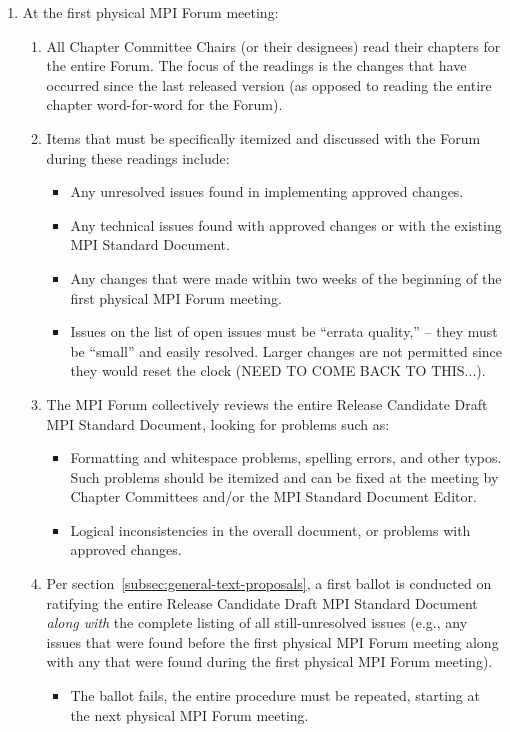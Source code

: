 {{\begin{enumerate}
\item At the first physical MPI Forum meeting:
  \begin{enumerate}
  \item All Chapter Committee Chairs (or their designees) read their
    chapters for the entire Forum.  The focus of the readings is the
    changes that have occurred since the last released version (as
    opposed to reading the entire chapter word-for-word for the
    Forum).
  \item Items that must be specifically itemized and discussed with
    the Forum during these readings include:
    \begin{itemize}
    \item Any unresolved issues found in implementing approved
      changes.
    \item Any technical issues found with approved changes or with the
      existing MPI Standard Document.
    \item Any changes that were made within two weeks of the beginning
      of the first physical MPI Forum meeting.
    \item Issues on the list of open issues must be ``errata
      quality,'' -- they must be ``small'' and easily resolved.
      Larger changes are not permitted since they would reset the
      clock (NEED TO COME BACK TO THIS...).
    \end{itemize}

  \item The MPI Forum collectively reviews the entire Release
    Candidate Draft MPI Standard Document, looking for problems such
    as:
    \begin{itemize}
    \item Formatting and whitespace problems, spelling errors, and
      other typos.  Such problems should be itemized and can be fixed
      at the meeting by Chapter Committees and/or the MPI Standard
      Document Editor.
    \item Logical inconsistencies in the overall document, or problems
      with approved changes.
    \end{itemize}

  \item Per section~\ref{subsec:general-text-proposals}, a first
    ballot is conducted on ratifying the entire Release Candidate
    Draft MPI Standard Document {\em along with} the complete listing
    of all still-unresolved issues (e.g., any issues that were found
    before the first physical MPI Forum meeting along with any that
    were found during the first physical MPI Forum meeting).
    \begin{itemize}
    \item The ballot fails, the entire procedure must be repeated,
      starting at the next physical MPI Forum meeting.
    \end{itemize}
  \end{enumerate}





\end{enumerate}}}
